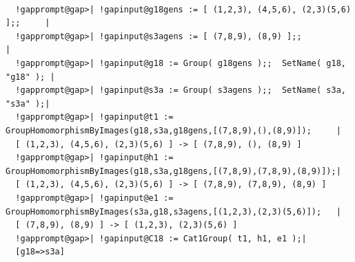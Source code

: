 \documentclass[a4paper,11pt]{report}
\begin{document}
{{ 

 
\begin{Verbatim}[commandchars=!@|,fontsize=\small,frame=single,label=Example]
  
  !gapprompt@gap>| !gapinput@g18gens := [ (1,2,3), (4,5,6), (2,3)(5,6) ];;     |
  !gapprompt@gap>| !gapinput@s3agens := [ (7,8,9), (8,9) ];;                |
  !gapprompt@gap>| !gapinput@g18 := Group( g18gens );;  SetName( g18, "g18" ); |
  !gapprompt@gap>| !gapinput@s3a := Group( s3agens );;  SetName( s3a, "s3a" );|
  !gapprompt@gap>| !gapinput@t1 := GroupHomomorphismByImages(g18,s3a,g18gens,[(7,8,9),(),(8,9)]);     |
  [ (1,2,3), (4,5,6), (2,3)(5,6) ] -> [ (7,8,9), (), (8,9) ]
  !gapprompt@gap>| !gapinput@h1 := GroupHomomorphismByImages(g18,s3a,g18gens,[(7,8,9),(7,8,9),(8,9)]);|
  [ (1,2,3), (4,5,6), (2,3)(5,6) ] -> [ (7,8,9), (7,8,9), (8,9) ]
  !gapprompt@gap>| !gapinput@e1 := GroupHomomorphismByImages(s3a,g18,s3agens,[(1,2,3),(2,3)(5,6)]);   |
  [ (7,8,9), (8,9) ] -> [ (1,2,3), (2,3)(5,6) ]
  !gapprompt@gap>| !gapinput@C18 := Cat1Group( t1, h1, e1 );|
  [g18=>s3a]
  
\end{Verbatim}
 

}}
\end{document}
